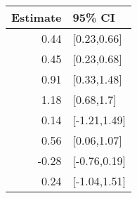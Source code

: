 \begin{tabular}{rl}
  \hline
Estimate & 95\% CI \\ 
  \hline
0.44 & [0.23,0.66] \\ 
  0.45 & [0.23,0.68] \\ 
  0.91 & [0.33,1.48] \\ 
  1.18 & [0.68,1.7] \\ 
  0.14 & [-1.21,1.49] \\ 
  0.56 & [0.06,1.07] \\ 
  -0.28 & [-0.76,0.19] \\ 
  0.24 & [-1.04,1.51] \\ 
   \hline
\end{tabular}

